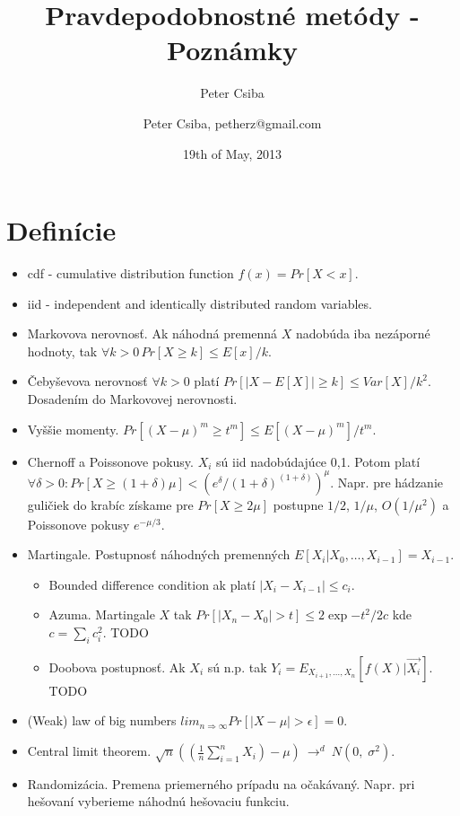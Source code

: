 \documentclass[12pt,a4paper]{article}
\author{Peter Csiba}
\title{Pravdepodobnostné metódy - Poznámky}
\date{19th of May, 2013}
\author{Peter Csiba, petherz@gmail.com}
\begin{document}
\maketitle


\section{Definície}
\begin{itemize} 
  \item cdf - cumulative distribution function $f(x) = Pr[X < x]$. 
  \item iid - independent and identically distributed random variables. 
  \item Markovova nerovnosť. Ak náhodná premenná $X$ nadobúda iba nezáporné hodnoty, tak $\forall k > 0 \, Pr[X \geq k] \leq E[x]/k$.
  \item Čebyševova nerovnosť $\forall k>0$ platí $Pr[|X-E[X]| \geq k] \leq Var[X]/k^2$. Dosadením do Markovovej nerovnosti. 
  \item Vyššie momenty. $Pr[(X-\mu)^m \geq t^m] \leq E[(X - \mu)^m]/t^m$. 
  \item Chernoff a Poissonove pokusy. $X_i$ sú iid nadobúdajúce 0,1. Potom platí $\forall \delta > 0 : Pr[X \geq (1 + \delta)\mu] < (e^\delta/(1 + \delta)^{(1+\delta)})^\mu$. Napr. pre hádzanie guličiek do krabíc získame pre $Pr[X \geq 2\mu]$ postupne $1/2$, $1/\mu$, $O(1/\mu^2)$ a Poissonove pokusy $e^{-\mu/3}$.
  \item Martingale. Postupnosť náhodných premenných $E[X_i | X_0, \ldots, X_{i-1}] = X_{i-1}$.
    \begin{itemize} 
      \item Bounded difference condition ak platí $|X_i - X_{i-1}| \leq c_i$.
      \item Azuma. Martingale $X$ tak $Pr[|X_n - X_0| > t] \leq 2 \exp{-t^2 / 2c}$ kde $c=\sum_i c_i^2$. TODO 
      \item Doobova postupnosť. Ak $X_i$ sú n.p. tak $Y_i = E_{X_{i+1}, \ldots, X_{n}}[f(X) | \overrightarrow{X_i}]$. TODO 
    \end{itemize} 
  \item (Weak) law of big numbers $lim_{n \Rightarrow \infty} Pr[|X - \mu| > \epsilon] = 0$. 
  \item Central limit theorem. $\sqrt{n}((\frac{1}{n}\sum_{i=1}^n X_i) - \mu)\ \rightarrow^d\ N(0,\;\sigma^2).$ 
  \item Randomizácia. Premena priemerného prípadu na očakávaný. Napr. pri hešovaní vyberieme náhodnú hešovaciu funkciu. 
\end{itemize} 
\end{document}
